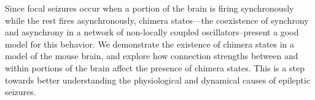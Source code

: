 Since focal seizures occur when a portion of the brain is firing synchronously while the rest fires asynchronously, chimera states---the coexistence of synchrony and asynchrony in a network of non-locally coupled oscillators--present a good model for this behavior.
We demonstrate the existence of chimera states in a model of the mouse brain, and explore how connection strengths between and within portions of the brain affect the presence of chimera states.
This is a step towards better understanding the physiological and dynamical causes of epileptic seizures.

